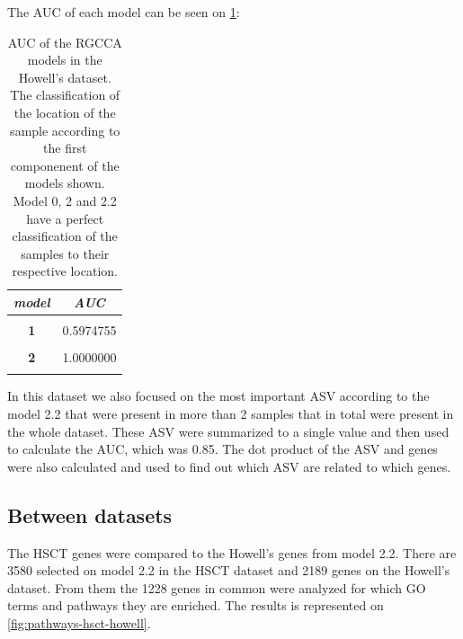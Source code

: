 \documentclass[
  12pt,
  a4paper,
  twoside,
  openright]{book}
\begin{document}
The AUC of each model can be seen on \ref{tab:howell-auc}:

\begin{table}[H]

\caption[AUC of the RGCCA models in the Howell's dataset]{\label{tab:howell-auc}AUC of the RGCCA models in the Howell's dataset. The classification of the location of the sample according to the first componenent of the models shown. Model 0, 2 and 2.2 have a perfect classification of the samples to their respective location.}
\centering
\begin{tabular}[t]{|>{}c|>{}c|}
\hline
\em{\textbf{model}} & \em{\textbf{AUC}}\\
\hline
\textbf{\cellcolor{gray!6}{0}} & \cellcolor{gray!6}{0.6255259}\\
\hline
\textbf{1} & 0.5974755\\
\hline
\textbf{\cellcolor{gray!6}{1.2}} & \cellcolor{gray!6}{1.0000000}\\
\hline
\textbf{2} & 1.0000000\\
\hline
\textbf{\cellcolor{gray!6}{2.2}} & \cellcolor{gray!6}{1.0000000}\\
\hline
\end{tabular}
\end{table}

In this dataset we also focused on the most important ASV according to the model 2.2 that were present in more than 2 samples that in total were present in the whole dataset.
These ASV were summarized to a single value and then used to calculate the AUC, which was 0.85.
The dot product of the ASV and genes were also calculated and used to find out which ASV are related to which genes.

\hypertarget{between-datasets}{%
\subsection{Between datasets}\label{between-datasets}}

The HSCT genes were compared to the Howell's genes from model 2.2.
There are 3580 selected on model 2.2 in the HSCT dataset and 2189 genes on the Howell's dataset.
From them the 1228 genes in common were analyzed for which GO terms and pathways they are enriched.
The results is represented on \ref{fig:pathways-hsct-howell}.
\end{document}
